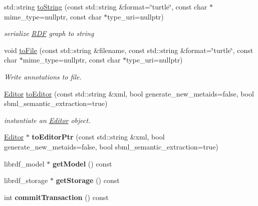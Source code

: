 \begin{DoxyCompactItemize}
std\+::string \hyperlink{classomexmeta_1_1RDF_a53bc4c91a3c39eef9b27886873badca2}{to\+String} (const std\+::string \&format=\char`\"{}turtle\char`\"{}, const char $\ast$mime\+\_\+type=nullptr, const char $\ast$type\+\_\+uri=nullptr)
\begin{DoxyCompactList}\small\item\em serialize \hyperlink{classomexmeta_1_1RDF}{R\+DF} graph to string \end{DoxyCompactList}\item 
void \hyperlink{classomexmeta_1_1RDF_a42a7be2a6261f03dc275b24a152dcaae}{to\+File} (const std\+::string \&filename, const std\+::string \&format=\char`\"{}turtle\char`\"{}, const char $\ast$mime\+\_\+type=nullptr, const char $\ast$type\+\_\+uri=nullptr)
\begin{DoxyCompactList}\small\item\em Write annotations to file. \end{DoxyCompactList}\item 
\hyperlink{classomexmeta_1_1Editor}{Editor} \hyperlink{classomexmeta_1_1RDF_ac09044c8a4c1af4f9536dbf29b4c3f3c}{to\+Editor} (const std\+::string \&xml, bool generate\+\_\+new\+\_\+metaids=false, bool sbml\+\_\+semantic\+\_\+extraction=true)
\begin{DoxyCompactList}\small\item\em instantiate an \hyperlink{classomexmeta_1_1Editor}{Editor} object. \end{DoxyCompactList}\item 
\mbox{\label{classomexmeta_1_1RDF_a80c6ad0b9c9daddd5e2150ababcc7476}} 
\hyperlink{classomexmeta_1_1Editor}{Editor} $\ast$ {\bfseries to\+Editor\+Ptr} (const std\+::string \&xml, bool generate\+\_\+new\+\_\+metaids=false, bool sbml\+\_\+semantic\+\_\+extraction=true)
\item 
\mbox{\label{classomexmeta_1_1RDF_a8007b0ce5729c7dd3f8cab86d42216f5}} 
librdf\+\_\+model $\ast$ {\bfseries get\+Model} () const
\item 
\mbox{\label{classomexmeta_1_1RDF_a71b0e5f3b85a87c2231e7700d86060c3}} 
librdf\+\_\+storage $\ast$ {\bfseries get\+Storage} () const
\item 
\mbox{\label{classomexmeta_1_1RDF_a711f228bb86c5cbf9740f64b8633d04c}} 
int {\bfseries commit\+Transaction} () const

\end{DoxyCompactItemize}
